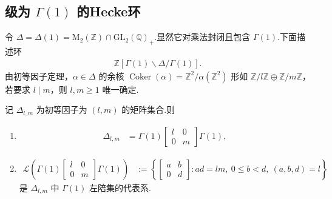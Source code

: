 \subsection{级为 \texorpdfstring{$\Gamma(1)$}{Γ(1)} 的Hecke环}\label{sec:modular-1-3-2}

令 $\Delta=\Delta(1)=\mathrm M_2(\mathbb Z)\cap\mathrm{GL}_2(\mathbb Q)_+$.显然它对乘法封闭且包含 $\Gamma(1)$.下面描述环
\begin{align*}
\mathbb Z[\Gamma(1)\backslash\Delta/\Gamma(1)].
\end{align*}
由初等因子定理，$\alpha\in\Delta$ 的余核 $\operatorname{Coker}(\alpha)=\mathbb Z^2/\alpha(\mathbb Z^2)$ 形如 $\mathbb Z/l\mathbb Z\oplus\mathbb Z/m\mathbb Z$，若要求 $l\mid m$，则 $l,m\ge1$ 唯一确定.

\begin{lemma*}

记 $\Delta_{l,m}$ 为初等因子为 $(l,m)$ 的矩阵集合.则

\begin{enumerate}[label=\roman*)]
\item
\begin{align*}
\Delta_{l,m}&=\Gamma(1)\begin{bmatrix}l&0\\0&m\end{bmatrix}\Gamma(1),
\end{align*}
\item
\begin{align*}
\mathcal L\left(\Gamma(1)\begin{bmatrix}l&0\\0&m\end{bmatrix}\Gamma(1)\right)&:=\left\{\begin{bmatrix}a&b\\0&d\end{bmatrix}:ad=lm,\ 0\le b<d,\ (a,b,d)=l\right\}
\end{align*}
是 $\Delta_{l,m}$ 中 $\Gamma(1)$ 左陪集的代表系.
\end{enumerate}

\end{lemma*}

